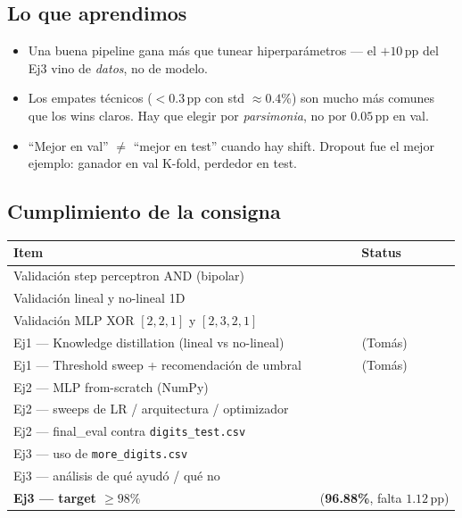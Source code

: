 \documentclass[11pt,a4paper]{article}
\newcommand{\ok}{\textcolor{good}{\ding{52}}}
\newcommand{\nok}{\textcolor{warn}{\ding{56}}}
\newcommand{\code}[1]{\texttt{\textcolor{accent}{#1}}}
\begin{document}
\subsection{Lo que aprendimos}
\begin{itemize}[leftmargin=1.4em, itemsep=2pt]
  \item Una buena pipeline gana más que tunear hiperparámetros — el \(+10\)\,pp del Ej3 vino de \emph{datos}, no de modelo.
  \item Los empates técnicos (\(<0.3\)\,pp con std \(\approx 0.4\)\%) son mucho más comunes que los wins claros. Hay que elegir por \emph{parsimonia}, no por \(0.05\)\,pp en val.
  \item ``Mejor en val'' \(\neq\) ``mejor en test'' cuando hay shift. Dropout fue el mejor ejemplo: ganador en val K-fold, perdedor en test.
\end{itemize}

\subsection{Cumplimiento de la consigna}

\begin{center}
\begin{tabular}{@{}lc@{}}
\toprule
\textbf{Item} & \textbf{Status} \\
\midrule
Validación step perceptron AND (bipolar)             & \ok \\
Validación lineal y no-lineal 1D                     & \ok \\
Validación MLP XOR \([2,2,1]\) y \([2,3,2,1]\)       & \ok \\
Ej1 — Knowledge distillation (lineal vs no-lineal)   & \ok\ (Tomás) \\
Ej1 — Threshold sweep + recomendación de umbral      & \ok\ (Tomás) \\
Ej2 — MLP from-scratch (NumPy)                       & \ok \\
Ej2 — sweeps de LR / arquitectura / optimizador      & \ok \\
Ej2 — final\_eval contra \code{digits\_test.csv}     & \ok \\
Ej3 — uso de \code{more\_digits.csv}                 & \ok \\
Ej3 — análisis de qué ayudó / qué no                 & \ok \\
\textbf{Ej3 — target \(\geq 98\%\)}                  & \nok\ (\textbf{96.88\%}, falta \(1.12\)\,pp) \\
\bottomrule
\end{tabular}
\end{center}
\end{document}
